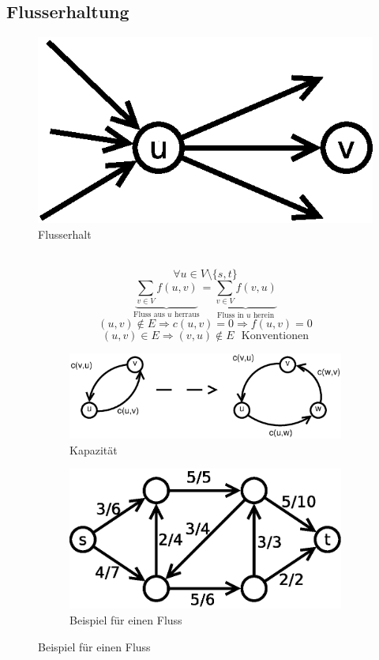 \subsection{Flusserhaltung}
\begin{figure}
	\vspace*{-20pt}
	\centering
	\includegraphics[width=\linewidth]{24/Grafik/Diagramm2}
	\caption{Flusserhalt}
	\label{fig:2}
	\end{figure}
	$ $
\[ \forall u\in V\setminus\{ s,t \} \]
\[  \underset{\text{Fluss aus $u$ herraus}}{\underbrace{\sum_{v\in V} f(u,v)}} = \underset{\text{Fluss in $u$ herein}}{\underbrace{\sum_{v\in V} f(v,u)}}  \]
\[ (u,v) \notin E \Rightarrow c(u,v) = 0 \Rightarrow f(u,v) = 0 \]
\[ (u,v) \in E \Rightarrow (v,u) \notin E~~~\text{Konventionen} \]
\begin{figure}[H]
	\begin{subfigure}[H]{0.5\linewidth}
\centering
\includegraphics[width=\linewidth]{24/Grafik/Diagramm3}
\caption{Kapazität}
\label{fig:Diagramm3}
\end{subfigure}
\begin{subfigure}[H]{0.4\linewidth}
	\centering
	\includegraphics[width=1\linewidth]{24/Grafik/Diagramm4}
	\caption{Beispiel für einen Fluss}
	\label{fig:Diagramm4}
\end{subfigure}
\end{figure}


